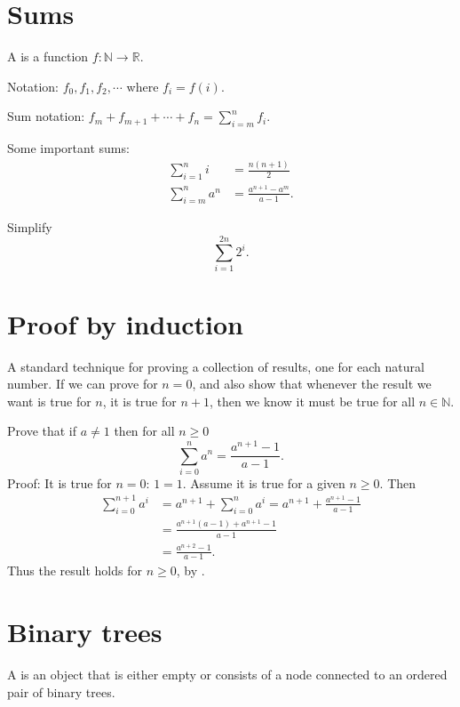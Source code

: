 \section{Sums}

A  is a function $f:\mathbb{N} \to \mathbb{R}$. 

Notation: $f_0, f_1, f_2, \cdots$ where $f_i = f(i)$.

Sum notation: $f_m+f_{m+1}+\cdots +f_n = \sum_{i=m}^n f_i$.

Some important sums: 
\begin{align*}
\sum_{i=1}^n i & = \frac{n(n+1)}{2} \\
\sum_{i=m}^n a^n&  = \frac{a^{n+1}-a^m}{a-1}.
\end{align*}

\begin{Boxample}[4]
Simplify 
$$
\sum_{i=1}^{2n} 2^i.
$$
\end{Boxample}

\section{Proof by induction}
A standard technique for proving a collection of results, one for each natural number. If we can prove for $n=0$, and also show that whenever the result we want is true for $n$, it is true for $n+1$, then we know it must be true for all $n\in \mathbb{N}$.

\begin{Example}
Prove that if $a\neq 1$ then for all  $n\geq 0$
$$
\sum_{i=0}^n a^n = \frac{a^{n+1} - 1}{a - 1}.
$$
Proof: It is true for $n=0$: $1 = 1$. Assume it is true for a given  $n\geq 0$. Then
\begin{align*}
\sum_{i=0}^{n+1} a^i & = a^{n+1} + \sum_{i=0}^n a^i 
= a^{n+1} + \frac{a^{n+1} - 1}{a-1} \\
& = \frac{a^{n+1} (a - 1) + a^{n+1} - 1}{a-1}\\
& = \frac{a^{n+2} - 1}{a-1}.
\end{align*}
Thus the result holds for  $n\geq 0$, by .
\end{Example}



\section{Binary trees}

A  is an object that is either empty or consists of a  node connected to an ordered pair of binary trees. 
 
